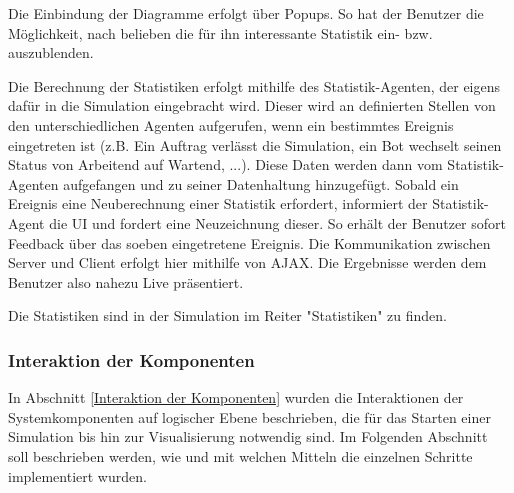 Die Einbindung der Diagramme erfolgt über Popups. So hat der Benutzer die Möglichkeit, nach belieben die für ihn interessante Statistik ein- bzw. auszublenden. 

Die Berechnung der Statistiken erfolgt mithilfe des Statistik-Agenten, der eigens dafür in die Simulation eingebracht wird. Dieser wird an definierten Stellen von den unterschiedlichen Agenten aufgerufen, wenn ein bestimmtes Ereignis eingetreten ist (z.B. Ein Auftrag verlässt die Simulation, ein Bot wechselt seinen Status von Arbeitend auf Wartend, ...). Diese Daten werden dann vom Statistik-Agenten aufgefangen und zu seiner Datenhaltung hinzugefügt. Sobald ein Ereignis eine Neuberechnung einer Statistik erfordert, informiert der Statistik-Agent die UI und fordert eine Neuzeichnung dieser. So erhält der Benutzer sofort Feedback über das soeben eingetretene Ereignis. Die Kommunikation zwischen Server und Client erfolgt hier mithilfe von AJAX. Die Ergebnisse werden dem Benutzer also nahezu Live präsentiert. 

Die Statistiken sind in der Simulation im Reiter "Statistiken" zu finden.

\subsubsection{Interaktion der Komponenten}
In Abschnitt \ref{Interaktion der Komponenten} wurden die Interaktionen der Systemkomponenten auf logischer Ebene beschrieben, die für das Starten einer Simulation bis hin zur Visualisierung notwendig sind. Im Folgenden Abschnitt soll beschrieben werden, wie und mit welchen Mitteln die einzelnen Schritte implementiert wurden. 
